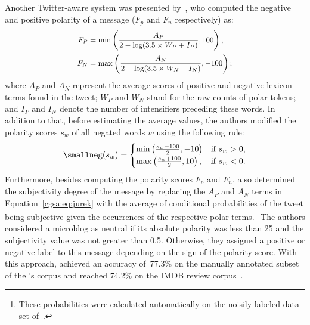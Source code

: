 Another Twitter-aware system was presented by~\citet{Jurek:15}, who
computed the negative and positive polarity of a message ($F_p$ and
$F_n$ respectively) as:
\begin{align}
  \small
  \begin{split}
  F_P &= \min\left(\frac{A_P}{2 - \log(3.5\times W_P + I_P)}, 100\right),\\
  F_N &= \max\left(\frac{A_N}{2 - \log(3.5\times W_N + I_N)}, -100\right);\label{cgsa:eq:jurek}
  \end{split}
\end{align}%
where $A_P$ and $A_N$ represent the average scores of positive and
negative lexicon terms found in the tweet; $W_P$ and $W_N$ stand for
the raw counts of polar tokens; and $I_P$ and $I_N$ denote the number
of intensifiers preceding these words.  In addition to that, before
estimating the average values, the authors modified the polarity
scores $s_w$ of all negated words $w$ using the following rule:
\begin{align*}
  \small%
neg(s_w) =
    \begin{cases}
        \min\left(\frac{s_w - 100}{2}, -10\right) & \text{if } s_w > 0,\\
        \max\left(\frac{s_w + 100}{2}, 10\right), & \text{if } s_w < 0.
    \end{cases}
\end{align*}%
Furthermore, besides computing the polarity scores $F_p$ and $F_n$,
\citeauthor{Jurek:15} also determined the subjectivity degree of the
message by replacing the $A_P$ and $A_N$ terms in
Equation~\ref{cgsa:eq:jurek} with the average of conditional
probabilities of the tweet being subjective given the occurrences of
the respective polar terms.\footnote{These probabilities were
  calculated automatically on the noisily labeled data set
  of~\citet{Go:09}.}  The authors considered a microblog as neutral if
its absolute polarity was less than 25 and the subjectivity value was
not greater than 0.5.  Otherwise, they assigned a positive or negative
label to this message depending on the sign of the polarity score.
With this approach, \citeauthor{Jurek:15} achieved an accuracy
of~77.3\% on the manually annotated subset of the \citeauthor{Go:09}'s
corpus and reached 74.2\% on the IMDB review corpus~\cite{Maas:11}.

